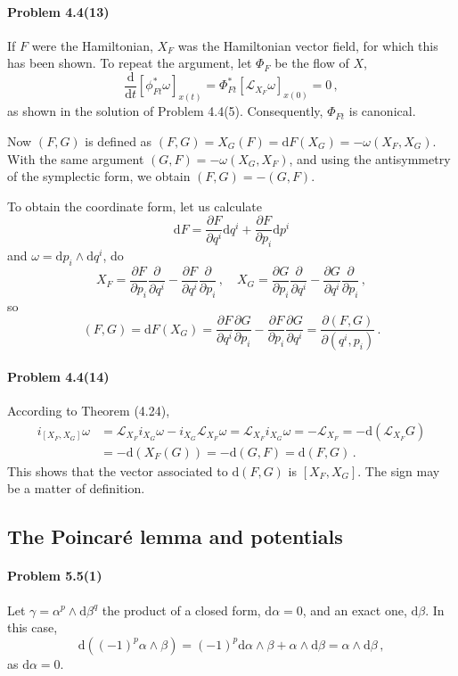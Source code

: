 \documentclass[a4paper,12pt]{article}
\def\d{\mathrm{d}}
\newcommand{\problem}[1]{\paragraph{Problem #1}}
\begin{document}

\problem{4.4(13)} If $F$ were the Hamiltonian, $X_F$ was the Hamiltonian vector field, for which this has been shown. To repeat the argument, let $\Phi_F$ be the flow of $X$,
\[
 \frac{\d}{\d t}[\phi_{Ft}^* \omega]_{x(t)} = \Phi_{Ft}^* [\mathcal{L}_{X_F}\omega]_{x(0)} = 0\,,
\]
as shown in the solution of Problem 4.4(5). Consequently, $\Phi_{Ft}$ is canonical.

Now $(F, G)$ is defined as $(F, G) = X_G(F) = \d F(X_G) = -\omega(X_F, X_G)$. With the same argument $(G, F)=-\omega(X_G, X_F)$, and using the antisymmetry of the symplectic form, we obtain $(F, G) = -(G, F)$.

To obtain the coordinate form, let us calculate
\[
 \d F = \frac{\partial F}{\partial q^i}\d q^i + \frac{\partial F}{\partial p_i}\d p^i
\]
and $\omega = \d p_i \wedge \d q^i$, do
\[
 X_F = \frac{\partial F}{\partial p_i}\frac{\partial}{\partial q^i} - \frac{\partial F}{\partial q^i}\frac{\partial}{\partial p_i}\,,
 \quad
 X_G = \frac{\partial G}{\partial p_i}\frac{\partial}{\partial q^i} - \frac{\partial G}{\partial q^i}\frac{\partial}{\partial p_i}\,,
\]
so
\[
 (F, G) = \d F (X_G) = \frac{\partial F}{\partial q^i}\frac{\partial G}{\partial p_i} -\frac{\partial F}{\partial p_i} \frac{\partial G}{\partial q^i} = \frac{\partial(F, G)}{\partial(q^i, p_i)}\,.
\]


\problem{4.4(14)} According to Theorem (4.24),
\[
 \begin{aligned}
i_{[X_F, X_G]}\omega &= \mathcal{L}_{X_F}i_{X_G}\omega - i_{X_G}\mathcal{L}_{X_F}\omega = \mathcal{L}_{X_F}i_{X_G}\omega = -\mathcal{L}_{X_F} = -\d (\mathcal{L}_{X_F}G)\\
&= -\d(X_F(G)) = -\d (G, F) = \d (F, G)\,.
 \end{aligned}
 \]
 This shows that the vector associated to $\d(F, G)$ is $[X_F, X_G]$. The sign may be a matter of definition.


\subsection{The Poincaré lemma and potentials}

\problem{5.5(1)} Let $\gamma = \alpha^p \wedge \d \beta^q$ the product of a closed form, $\d \alpha =0$, and an exact one, $\d \beta$. In this case,
\[
 \d ((-1)^p\alpha \wedge \beta) = (-1)^p\d \alpha \wedge \beta + \alpha \wedge \d \beta = \alpha \wedge \d \beta\,,
\]
as $\d \alpha=0$.
\end{document}
